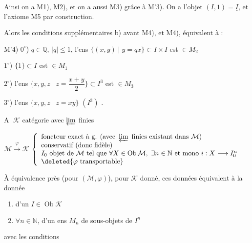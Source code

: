 

Ainsi on a M1), M2), et on a aussi M3) grâce à M'3). On a l'objet $(I,1)=\underline I$,  et l'axiome M5 par construction.

Alors les conditions supplémentaires b) avant M4), et M4), équivalent à :

M'4) $0^\circ$)  $q\in\mathbb Q$, $|q|\leq1$, l'ens
$\{(x,y)\mid y=qx\}\subset I\times I$ est $\in M_2$

$1^\circ$)  $\{1\}\subset I$ est $\in M_1$

$2^\circ$) l'ens $\{x,y,z\mid z=\dfrac{x+y}{2}\}\subset I^3$ est $\in M_3$

$3^\circ$) l'ens $\{x,y,z\mid z=xy\}$ $(I^3)$ \text{---}.


\textcircled{A} $\mathcal K$ catégorie avec $\varprojlim$ finies

$\mathcal M\xrightarrow{\varphi}\mathcal K$
$\left\{\begin{array}{l}
\text{foncteur exact à g. (avec }\varprojlim\text{ finies existant dans }\mathcal M)\\
\text{conservatif (donc fidèle)}\\
I_0\text{ objet de }\mathcal M\text{ tel que }\forall X\in\operatorname{Ob}\mathcal M,\ \exists n\in\mathbb N
\text{ et mono }i:X\longrightarrow I_0^n\\
\deleted{\varphi\text{ transportable}}
\end{array}\right.$

À équivalence près (pour $(\mathcal M,\varphi)$), pour $\mathcal K$ donné, ces données équivalent à la donnée
\begin{enumerate}
\item[a)] d'un $I\in\operatorname{Ob}\mathcal K$
\item[b)] $\forall n\in\mathbb N$, d'un ens $M_n$ de sous-objets de $I^n$
\end{enumerate}
avec les conditions

